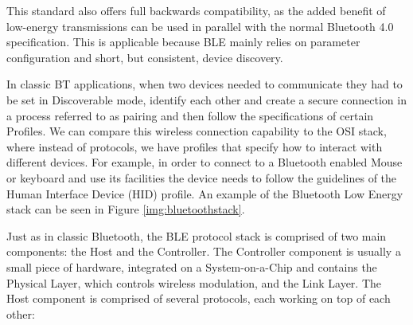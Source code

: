 This standard also offers full backwards compatibility, as the added benefit of low-energy transmissions can be used in parallel with the normal Bluetooth 4.0 specification. This is applicable because BLE mainly relies on parameter configuration and short, but consistent, device discovery.

In classic BT applications, when two devices needed to communicate they had to be set in Discoverable mode, identify each other and create a secure connection in a process referred to as pairing and then follow the specifications of certain Profiles. We can compare this wireless connection capability to the OSI stack, where instead of protocols, we have profiles that specify how to interact with different devices. For example, in order to connect to a Bluetooth enabled
Mouse or keyboard and use its facilities the device needs to follow the guidelines of the Human Interface Device (HID) profile. An example of the Bluetooth Low Energy stack can be seen in Figure \ref{img:bluetoothstack}.


Just as in classic Bluetooth\cite{haartsen2000bluetooth}, the BLE protocol stack is comprised of two main components: the Host and the Controller. The Controller component is usually a small piece of hardware, integrated on a System-on-a-Chip and contains  the Physical Layer, which controls wireless modulation, and the Link Layer. The Host component is comprised of several protocols, each working on top of each other:

